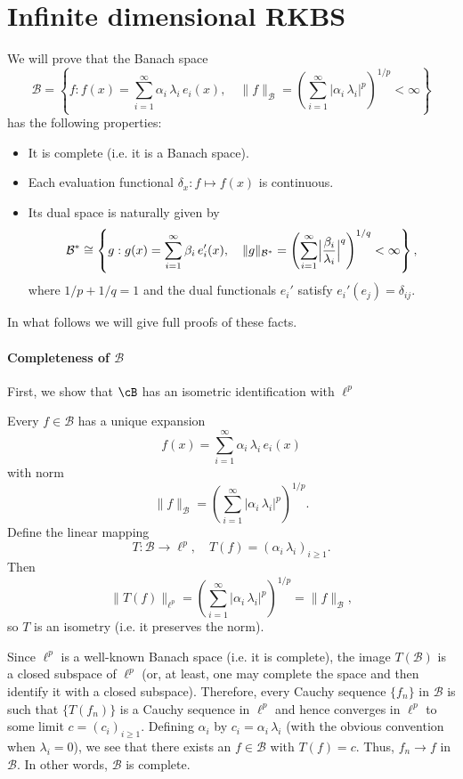 \section{Infinite dimensional RKBS}

We will prove that the Banach space
\[
\mathcal{B} = \left\{ f : f(x) = \sum_{i=1}^\infty \alpha_i\,\lambda_i\, e_i(x),\quad \|f\|_{\mathcal{B}} = \left(\sum_{i=1}^\infty |\alpha_i\,\lambda_i|^p\right)^{1/p} < \infty \right\}
\]
has the following properties:
\begin{itemize}
    \item It is complete (i.e. it is a Banach space).
    \item Each evaluation functional \(\delta_x: f\mapsto f(x)\) is continuous.
    \item Its dual space is naturally given by
   \[
   \mathcal{B}^* \cong \left\{ g : g(x)=\sum_{i=1}^\infty \beta_i\, e_i'(x),\quad \|g\|_{\mathcal{B}^*} = \left(\sum_{i=1}^\infty \Bigl|\frac{\beta_i}{\lambda_i}\Bigr|^q\right)^{1/q} < \infty \right\},
   \]
   where \(1/p+1/q=1\) and the dual functionals \(e_i'\) satisfy \(e_i'(e_j)=\delta_{ij}\).
\end{itemize}
 

In what follows we will give full proofs of these facts.


\paragraph{Completeness of \(\mathcal{B}\)}

First, we show that $\cB$  has an isometric identification with \(\ell^p\)

Every \(f\in\mathcal{B}\) has a unique expansion
\[
f(x)= \sum_{i=1}^\infty \alpha_i\,\lambda_i\, e_i(x)
\]
with norm
\[
\|f\|_{\mathcal{B}} = \left(\sum_{i=1}^\infty |\alpha_i\,\lambda_i|^p\right)^{1/p}.
\]
Define the linear mapping
\[
T:\mathcal{B}\to \ell^p,\quad T(f)=(\alpha_i\,\lambda_i)_{i\ge1}.
\]
Then
\[
\|T(f)\|_{\ell^p} = \left(\sum_{i=1}^\infty |\alpha_i\,\lambda_i|^p\right)^{1/p} = \|f\|_{\mathcal{B}},
\]
so \(T\) is an isometry (i.e. it preserves the norm).

Since \(\ell^p\) is a well-known Banach space (i.e. it is complete), the image \(T(\mathcal{B})\) is a closed subspace of \(\ell^p\) (or, at least, one may complete the space and then identify it with a closed subspace). Therefore, every Cauchy sequence \(\{f_n\}\) in \(\mathcal{B}\) is such that \(\{T(f_n)\}\) is a Cauchy sequence in \(\ell^p\) and hence converges in \(\ell^p\) to some limit \(c=(c_i)_{i\ge1}\). Defining \(\alpha_i\) by \(c_i=\alpha_i\,\lambda_i\) (with the obvious convention when \(\lambda_i=0\)), we see that there exists an \(f\in\mathcal{B}\) with \(T(f)=c\). Thus, \(f_n\to f\) in \(\mathcal{B}\). In other words, \(\mathcal{B}\) is complete.

